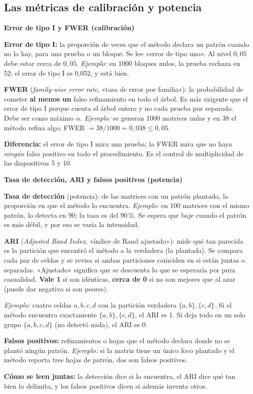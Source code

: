 \documentclass[11pt,a4paper]{article}
\newcommand{\cajainicio}[3]{\par\medskip\noindent
  \begin{lrbox}{\cajabox}\begin{minipage}{\dimexpr\linewidth-2\fboxsep-2\fboxrule\relax}%
  \textbf{\color{#1}#3}\par\smallskip}
\newcommand{\cajafin}[2]{\end{minipage}\end{lrbox}\fcolorbox{#1}{#2}{\usebox{\cajabox}}\par\medskip}
\newenvironment{nota}[1]{\cajainicio{acc}{acc!7}{#1}}{\cajafin{acc}{acc!7}}
\begin{document}
\subsection*{Las métricas de calibración y potencia}

\begin{nota}{Error de tipo I y FWER (calibración)}
\textbf{Error de tipo I:} la proporción de veces que el método declara un patrón cuando no lo hay, para una prueba o un bloque. Se lee «error de tipo uno». Al nivel $0{,}05$ debe estar cerca de $0{,}05$. \textit{Ejemplo:} en 1000 bloques nulos, la prueba rechaza en 52; el error de tipo I es 0,052, y está bien.

\textbf{FWER} (\emph{family-wise error rate}, «tasa de error por familia»): la probabilidad de cometer \textbf{al menos un} falso refinamiento en todo el árbol. Es más exigente que el error de tipo I porque cuenta el árbol entero y no cada prueba por separado. Debe ser como máximo $\alpha$. \textit{Ejemplo:} se generan 1000 matrices nulas y en 38 el método refina algo; FWER $=38/1000=0{,}038\le 0{,}05$.

\textbf{Diferencia:} el error de tipo I mira una prueba; la FWER mira que no haya \emph{ningún} falso positivo en todo el procedimiento. Es el control de multiplicidad de las diapositivas 5 y 10.
\end{nota}

\begin{nota}{Tasa de detección, ARI y falsos positivos (potencia)}
\textbf{Tasa de detección} (potencia): de las matrices con un patrón plantado, la proporción en que el método lo encuentra. \textit{Ejemplo:} en 100 matrices con el mismo patrón, lo detecta en 90; la tasa es del 90\,\%. Se espera que baje cuando el patrón es más débil, y por eso se varía la intensidad.

\textbf{ARI} (\emph{Adjusted Rand Index}, «índice de Rand ajustado»): mide qué tan parecida es la partición que encontró el método a la verdadera (la plantada). Se compara cada par de celdas y se revisa si ambas particiones coinciden en si están juntas o separadas. «Ajustado» significa que se descuenta lo que se esperaría por pura casualidad. \textbf{Vale 1} si son idénticas, \textbf{cerca de 0} si no son mejores que al azar (puede dar negativo si son peores).

\textit{Ejemplo:} cuatro celdas $a,b,c,d$ con la partición verdadera $\{a,b\},\{c,d\}$. Si el método encuentra exactamente $\{a,b\},\{c,d\}$, el ARI es 1. Si deja todo en un solo grupo $\{a,b,c,d\}$ (no detectó nada), el ARI es 0.

\textbf{Falsos positivos:} refinamientos o hojas que el método declara donde no se plantó ningún patrón. \textit{Ejemplo:} si la matriz tiene un único foco plantado y el método reporta tres hojas de patrón, dos son falsos positivos.

\textbf{Cómo se leen juntas:} la detección dice si lo encuentra, el ARI dice qué tan bien lo delimita, y los falsos positivos dicen si además inventa otros.
\end{nota}
\end{document}
